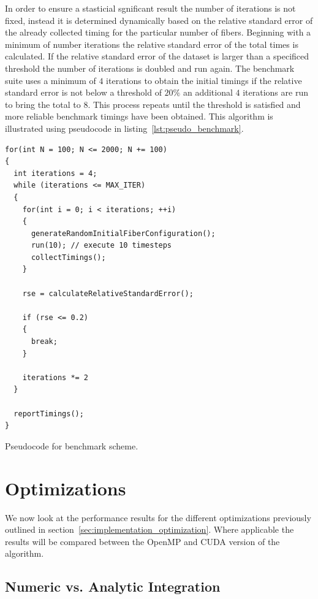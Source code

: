 \documentclass[a4paper,11pt]{kth-mag}
\begin{document}
In order to ensure a stasticial sgnificant result the number of iterations is not fixed, instead it is determined dynamically based on the relative standard error of the already collected timing for the particular number of fibers. Beginning with a minimum of number iterations the relative standard error of the total times is calculated. If the relative standard error of the dataset is larger than a specificed threshold the number of iterations is doubled and run again. The benchmark suite uses a minimum of $4$ iterations to obtain the initial timings if the relative standard error is not below a threshold of $20\%$ an additional $4$ iterations are run to bring the total to $8$. This process repeats until the threshold is satisfied and more reliable benchmark timings have been obtained. This algorithm is illustrated using pseudocode in listing~\ref{lst:pseudo_benchmark}.

\begin{listing}
  \centering
  \begin{verbatim}
for(int N = 100; N <= 2000; N += 100)
{
  int iterations = 4;
  while (iterations <= MAX_ITER)
  {
    for(int i = 0; i < iterations; ++i)
    {
      generateRandomInitialFiberConfiguration();
      run(10); // execute 10 timesteps
      collectTimings();
    }

    rse = calculateRelativeStandardError();

    if (rse <= 0.2)
    {
      break;
    }

    iterations *= 2
  }

  reportTimings();
}
  \end{verbatim}
  \caption{Pseudocode for benchmark scheme.}
  \label{lst:pseudo_benchmark}
\end{listing}

\section{Optimizations}

We now look at the performance results for the different optimizations previously outlined in section~\ref{sec:implementation_optimization}. Where applicable the results will be compared between the OpenMP and CUDA version of the algorithm.

\subsection{Numeric vs. Analytic Integration}
\end{document}
